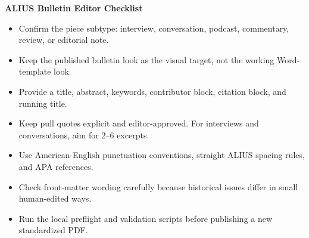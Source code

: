 \documentclass[11pt]{article}
\begin{document}
{\LARGE\bfseries ALIUS Bulletin Editor Checklist\par}
\vspace{1em}
\begin{itemize}[leftmargin=1.5em]
\item Confirm the piece subtype: interview, conversation, podcast, commentary, review, or editorial note.
\item Keep the published bulletin look as the visual target, not the working Word-template look.
\item Provide a title, abstract, keywords, contributor block, citation block, and running title.
\item Keep pull quotes explicit and editor-approved. For interviews and conversations, aim for 2--6 excerpts.
\item Use American-English punctuation conventions, straight ALIUS spacing rules, and APA references.
\item Check front-matter wording carefully because historical issues differ in small human-edited ways.
\item Run the local preflight and validation scripts before publishing a new standardized PDF.
\end{itemize}
\end{document}
